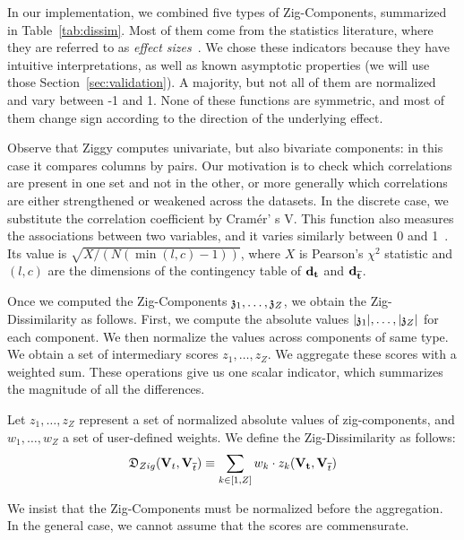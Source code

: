 In our implementation, we combined five types of Zig-Com\-po\-nents, summarized
in Table~\ref{tab:dissim}.  Most of them come from the statistics literature,
where they are referred to as \emph{effect sizes}~\cite{cohen1977statistical,
hedges2014statistical}.  We chose these indicators because they have intuitive
interpretations, as well as known asymptotic properties (we will use those
Section~\ref{sec:validation}).  A majority, but not all of them are normalized
and vary between -1 and 1. None of these functions are symmetric, and most of
them change sign according to the direction of the underlying effect.

Observe that Ziggy computes univariate, but also bivariate components: in this
case it compares columns by pairs. Our motivation is to check which
correlations are present in one set and not in the other, or more generally
which correlations are either strengthened or weakened across the datasets. In
the discrete case, we substitute the correlation coefficient by Cram\'er' s V.
This function also measures the associations between two variables, and it
varies similarly between 0 and 1~\cite{cohen1977statistical}. Its value is
$\sqrt{X/(N(\min(l,c) - 1))}$, where $X$ is Pearson's $\chi^2$ statistic and
$(l,c)$ are the dimensions of the contingency table of $\bf{d}_t$ and
$\bf{d}_{\overline{t}}$.

Once we computed the Zig-Components $\mathfrak{z}_1, \ldots, \mathfrak{z}_Z$, we obtain the
Zig-Dissimilarity as follows. First, we compute the absolute values
$|\mathfrak{z}_1|, \ldots, |\mathfrak{z}_Z|$ for each component. We then normalize the
values across components of same type. We obtain a set of intermediary scores
$z_1, \ldots, z_Z$. We aggregate these scores with a weighted sum.
These operations give us one scalar indicator, which summarizes the magnitude
of all the differences.

\begin{definition}
    Let $z_1, \ldots, z_Z$ represent a set of normalized absolute values of
    zig-components, and $w_1, \ldots, w_Z$ a set of user-defined weights.  We
    define the Zig-Dissimilarity as follows: 
    \begin{equation}
        \mathfrak{D}_{Zig}(\mathbf{V}_t, \mathbf{V}_{\overline{t}}) 
        \equiv \sum_{k \in [1, Z]} w_k \cdot z_k(\mathbf{V_t}, \mathbf{V}_{\overline{t}})
    \end{equation}
\end{definition}
We insist that the Zig-Components must be normalized before the aggregation.
In the general case, we cannot assume that the scores are commensurate.

